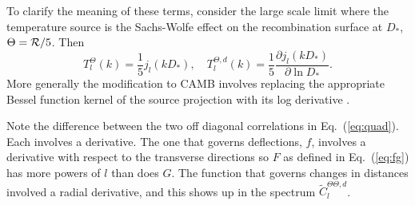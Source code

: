 \documentclass[prd,amsmath,amssymb,floatfix,superscriptaddress,nofootinbib,twocolumn]{revtex4-1}
\def\be{\begin{equation}}
\def\ee{\end{equation}}
\def\bea{\begin{eqnarray}}
\def\eea{\end{eqnarray}}
\newcommand{\vs}{\nonumber\\}
\newcommand{\ec}[1]{Eq.~(\ref{eq:#1})}
\newcommand{\eql}[1]{\label{eq:#1}}
\begin{document}
To clarify the meaning of these terms, consider the large scale limit where the temperature
source is the Sachs-Wolfe effect on the recombination surface at $D_*$, 
 $\Theta = {\cal R}/5$.   Then
 \begin{equation}
 T_l^\Theta(k) = \frac{1}{5} j_l(k D_*), \quad  T_l^{\Theta,d} (k) = \frac{1}{5}
 \frac{\partial j_l(k D_*)}{\partial \ln D_*}.
\end{equation}
More generally the modification to CAMB involves replacing the appropriate Bessel function kernel of
the source projection with its log derivative \cite{Hu:2001yq}.


Note the difference between the two off diagonal correlations in \ec{quad}. Each involves a derivative. The one that governs deflections, $f$, %
involves a derivative with respect to the transverse directions so $F$ as defined in \ec{fg} has more powers of $l$ than does $G$.  
The function that governs changes in distances involved a radial derivative, and this shows up in the spectrum $\tilde{C}^{\Theta\Theta,d}_{l}$.
\end{document}
